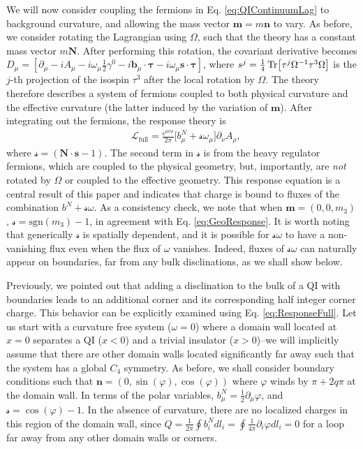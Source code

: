 \documentclass[%
 reprint,
 amsmath,amssymb,
 aps,
]{revtex4-1}
\begin{document}
We will now consider coupling the fermions in Eq. \ref{eq:QIContinuumLag} to background curvature, and allowing the mass vector $\bm{m} = m\bm{n}$ to vary. As before, we consider rotating the Lagrangian using $\Omega$, such that the theory has a constant mass vector $m \bm{N}$. After performing this rotation, the covariant derivative becomes $D_\mu = [\partial_\mu - i A_\mu  - i \omega_\mu \frac{1}{2} \gamma^0 - i \bm{b}_\mu \cdot \bm{\tau} - i \omega_\mu \bm{s}\cdot \bm{\tau}]$, where $s^j = \frac{1}{4}\Tr[\tau^{j}\Omega^{-1}\tau^3 \Omega]$ is the $j$-th projection of the isospin $\tau^3$ after the local rotation by $\Omega$. The theory therefore describes a system of fermions coupled to both physical curvature and the effective curvature (the latter induced by the variation of ${\bm{m}}$). After integrating out the fermions, the response theory is
\begin{equation}\begin{split}
&\mathcal{L}_{\text{full}} = \frac{\epsilon^{\mu\nu\rho}}{2\pi}\Big[b^N_\mu + \mathscr{s}\omega_\mu\Big]\partial_\nu A_{\rho},
\label{eq:ResponseFull}\end{split}\end{equation}
where $\mathscr{s} = (\bm{N}\cdot\bm{s}-1)$. The second term in $\mathscr{s}$ is from the heavy regulator fermions, which are coupled to the physical geometry, but, importantly, are \textit{not} rotated by $\Omega$ or coupled to the effective geometry. This response equation is a central result of this paper and indicates that charge is bound to fluxes of the combination $b^N+\mathscr{s}\omega$. As a consistency check, we note that when $\bm{m} = (0,0,m_3)$, $\mathscr{s} = \text{sgn}(m_3)-1$, in agreement with Eq. \ref{eq:GeoResponse}. It is worth noting that generically $\mathscr{s}$ is spatially dependent, and it is possible for $\mathscr{s} \omega$ to have a non-vanishing flux even when the flux of $\omega$ vanishes. Indeed, fluxes of $\mathscr{s} \omega$ can naturally appear on boundaries, far from any bulk disclinations, as we shall show below.


Previously, we pointed out that adding a disclination to the bulk of a QI with boundaries leads to an additional corner and its corresponding half integer corner charge. This behavior can be explicitly examined using Eq. \ref{eq:ResponseFull}. Let us start with a curvature free system ($\omega = 0$) where a domain wall located at $x=0$ separates a QI ($x<0$) and a trivial insulator ($x>0$)--we will implicitly assume that there are other domain walls located significantly far away such that the system has a global $C_4$ symmetry. As before, we shall consider boundary conditions such that $\bm{n} = (0,\sin(\varphi),\cos(\varphi))$ where $\varphi$ winds by $\pi + 2q\pi$ at the domain wall. In terms of the polar variables, $b^N_\mu = \frac{1}{2}\partial_\mu \varphi$, and $\mathscr{s} = \cos(\varphi)-1$. In the absence of curvature, there are no localized charges in this region of the domain wall, since $Q = \frac{1}{2\pi}\oint b^N_i dl_i = \oint \frac{1}{4\pi}\partial_i \varphi dl_i = 0$ for a loop far away from any other domain walls or corners. 
\end{document}
